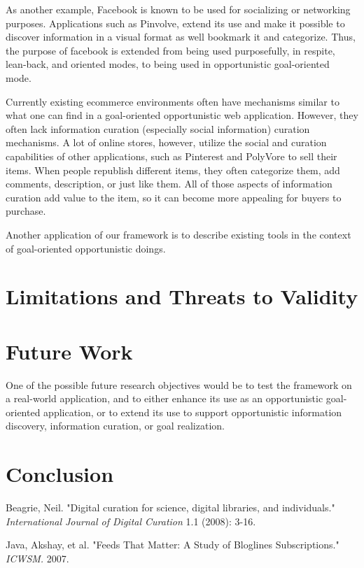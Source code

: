 \documentclass{casconpaper}
\begin{document}
{As another example, Facebook is known to be used for socializing or networking purposes.  Applications such as Pinvolve, extend its use and make it possible to discover information in a visual format as well bookmark it and categorize. Thus, the purpose  of facebook is extended from being used purposefully, in respite, lean-back, and oriented modes, to being used in opportunistic goal-oriented mode. 

Currently existing ecommerce environments often have mechanisms similar to what one can find in a goal-oriented opportunistic web application. However,  they often lack information curation (especially social information) curation mechanisms. A lot of online stores, however, utilize the social and curation capabilities of other applications, such as Pinterest and PolyVore to sell their items. When people republish different items, they often categorize them, add comments, description, or just like them. All of those aspects of information curation add value to the item, so it can become more appealing for buyers to purchase. 

Another application of our framework is to describe existing tools in the context of goal-oriented opportunistic doings. 
} %


{\section{Limitations and Threats to Validity}

} %

{\section{ Future Work}
One of the possible future research objectives would be to test the framework on a real-world application, and to either enhance its use as an opportunistic goal-oriented application, or to extend its use  to support opportunistic information discovery, information curation, or goal realization. 

} %

{\section{Conclusion}
 
} %



{\begin{thebibliography}{9}

Beagrie, Neil. "Digital curation for science, digital libraries, and individuals." \emph{International Journal of Digital Curation} 1.1 (2008): 3-16.

	Java, Akshay, et al. "Feeds That Matter: A Study of Bloglines 		Subscriptions." \emph{ ICWSM.} 2007.
   
    
    
\end{thebibliography}
} %
\end{document}

